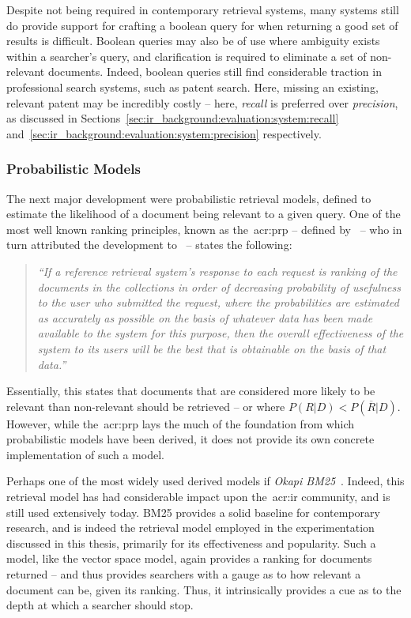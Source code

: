 Despite not being required in contemporary retrieval systems, many systems still do provide support for crafting a boolean query for when returning a good set of results is difficult. Boolean queries may also be of use where ambiguity exists within a searcher's query, and clarification is required to eliminate a set of non-relevant documents. Indeed, boolean queries still find considerable traction in professional search systems, such as patent search. Here, missing an existing, relevant patent may be incredibly costly -- here, \emph{recall} is preferred over \emph{precision}, as discussed in Sections~\ref{sec:ir_background:evaluation:system:recall} and~\ref{sec:ir_background:evaluation:system:precision} respectively.

\subsubsection{Probabilistic Models}
The next major development were probabilistic retrieval models, defined to estimate the likelihood of a document being relevant to a given query. One of the most well known ranking principles, known as the~\gls{acr:prp} -- defined by~\cite{robertson1977prp} -- who in turn attributed the development to~\cite{cooper1971relevance} -- states the following:

\begin{quote}
\emph{``If a reference retrieval system's response to each request is ranking of the documents in the collections in order of decreasing probability of usefulness to the user who submitted the request, where the probabilities are estimated as accurately as possible on the basis of whatever data has been made available to the system for this purpose, then the overall effectiveness of the system to its users will be the best that is obtainable on the basis of that data.''}
\end{quote}

Essentially, this states that documents that are considered more likely to be relevant than non-relevant should be retrieved -- or where $P(R|D) < P(\overline{R}|D)$. However, while the~\gls{acr:prp} lays the much of the foundation from which probabilistic models have been derived, it does not provide its own concrete implementation of such a model.

Perhaps one of the most widely used derived models if \emph{Okapi BM25}~\citep{robertson1995trec3}. Indeed, this retrieval model has had considerable impact upon the~\gls{acr:ir} community, and is still used extensively today. BM25 provides a solid baseline for contemporary research, and is indeed the retrieval model employed in the experimentation discussed in this thesis, primarily for its effectiveness and popularity. Such a model, like the vector space model, again provides a ranking for documents returned -- and thus provides searchers with a gauge as to how relevant a document can be, given its ranking. Thus, it intrinsically provides a cue as to the depth at which a searcher should stop.

